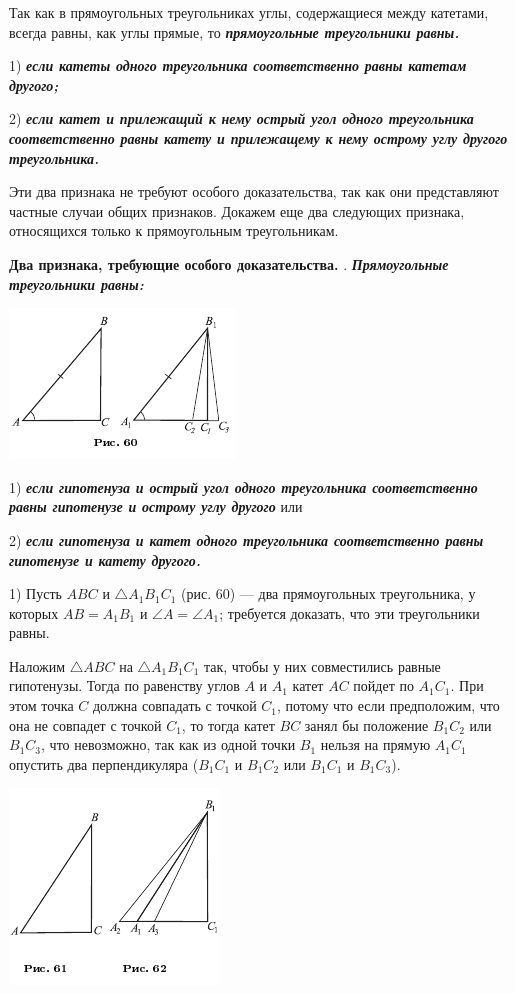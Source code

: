 \documentclass[oneside]{book}
\begin{document}
Так как в прямоугольных треугольниках углы, содержащиеся между катетами, всегда равны, как углы прямые, то \textbf{\emph{прямоугольные треугольники равны.}}

1) \textbf{\emph{если катеты одного треугольника соответственно равны катетам другого;}}

2) \textbf{\emph{если катет и прилежащий к нему острый угол одного треугольника соответственно равны катету и прилежащему к нему острому углу другого треугольника.}}

Эти два признака не требуют особого доказательства, так как они представляют частные случаи общих признаков.
Докажем еще два следующих признака, относящихся только к прямоугольным треугольникам.

\textbf{Два признака, требующие особого доказательства.}
.
\textbf{\emph{Прямоугольные треугольники равны:}}

\includegraphics{pics/ris-60}

1) \textbf{\emph{если гипотенуза и острый угол одного треугольника соответственно равны гипотенузе и острому углу другого}} или

2) \textbf{\emph{если гипотенуза и катет одного треугольника соответственно равны гипотенузе и катету другого.}}

1) Пусть $ABC$ и $\triangle A_1B_1C_1$ (рис. 60) — два прямоугольных треугольника, у которых $AB=A_1B_1$ и $\angle A = \angle A_1$;
требуется доказать, что эти треугольники равны.

Наложим $\triangle ABC$ на $\triangle A_1B_1C_1$ так, чтобы у них совместились равные гипотенузы.
Тогда по равенству углов $A$ и $A_1$ катет $AC$ пойдет по $A_1C_1$.
При этом точка $C$ должна совпадать с точкой $C_1$, потому что если предположим, что она не совпадет с точкой $C_1$, то тогда катет $BC$ занял бы положение $B_1C_2$ или $B_1C_3$, что невозможно, так как из одной точки $B_1$ нельзя на прямую $A_1C_1$ опустить два перпендикуляра ($B_1C_1$ и $B_1C_2$ или $B_1C_1$ и $B_1C_3$).

\includegraphics{pics/ris-61-62}
\end{document}
